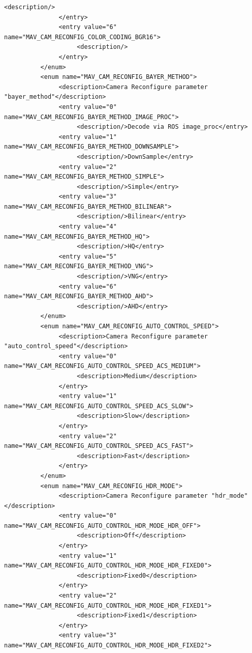 \begin{lstlisting}[captionpos=b, caption="Definition of \textsc{Skye} specific Mavlink messages", label=app_xml]
                    <description/>
               </entry>
               <entry value="6" name="MAV_CAM_RECONFIG_COLOR_CODING_BGR16">
                    <description/>
               </entry>
          </enum>
          <enum name="MAV_CAM_RECONFIG_BAYER_METHOD">
               <description>Camera Reconfigure parameter "bayer_method"</description>
               <entry value="0" name="MAV_CAM_RECONFIG_BAYER_METHOD_IMAGE_PROC">
                    <description/>Decode via ROS image_proc</entry>
               <entry value="1" name="MAV_CAM_RECONFIG_BAYER_METHOD_DOWNSAMPLE">
                    <description/>DownSample</entry>
               <entry value="2" name="MAV_CAM_RECONFIG_BAYER_METHOD_SIMPLE">
                    <description/>Simple</entry>
               <entry value="3" name="MAV_CAM_RECONFIG_BAYER_METHOD_BILINEAR">
                    <description/>Bilinear</entry>
               <entry value="4" name="MAV_CAM_RECONFIG_BAYER_METHOD_HQ">
                    <description/>HQ</entry>
               <entry value="5" name="MAV_CAM_RECONFIG_BAYER_METHOD_VNG">
                    <description/>VNG</entry>
               <entry value="6" name="MAV_CAM_RECONFIG_BAYER_METHOD_AHD">
                    <description/>AHD</entry>
          </enum>
          <enum name="MAV_CAM_RECONFIG_AUTO_CONTROL_SPEED">
               <description>Camera Reconfigure parameter "auto_control_speed"</description>
               <entry value="0" name="MAV_CAM_RECONFIG_AUTO_CONTROL_SPEED_ACS_MEDIUM">
                    <description>Medium</description>
               </entry>
               <entry value="1" name="MAV_CAM_RECONFIG_AUTO_CONTROL_SPEED_ACS_SLOW">
                    <description>Slow</description>
               </entry>
               <entry value="2" name="MAV_CAM_RECONFIG_AUTO_CONTROL_SPEED_ACS_FAST">
                    <description>Fast</description>
               </entry>
          </enum>
          <enum name="MAV_CAM_RECONFIG_HDR_MODE">
               <description>Camera Reconfigure parameter "hdr_mode"</description>
               <entry value="0" name="MAV_CAM_RECONFIG_AUTO_CONTROL_HDR_MODE_HDR_OFF">
                    <description>Off</description>
               </entry>
               <entry value="1" name="MAV_CAM_RECONFIG_AUTO_CONTROL_HDR_MODE_HDR_FIXED0">
                    <description>Fixed0</description>
               </entry>
               <entry value="2" name="MAV_CAM_RECONFIG_AUTO_CONTROL_HDR_MODE_HDR_FIXED1">
                    <description>Fixed1</description>
               </entry>
               <entry value="3" name="MAV_CAM_RECONFIG_AUTO_CONTROL_HDR_MODE_HDR_FIXED2">

\end{lstlisting}

